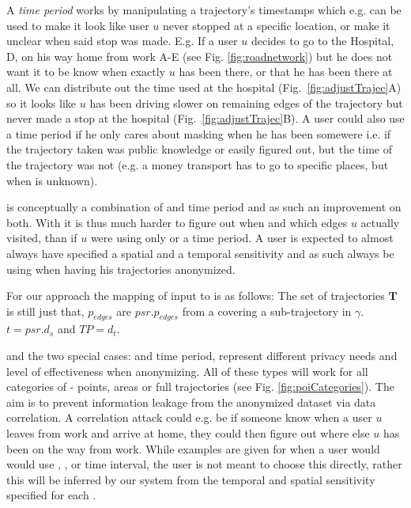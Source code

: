 A {\it time period} works by manipulating a trajectory's timestamps which e.g. can be used to make it look like user $u$ never stopped at a specific location, or make it unclear when said stop was made. E.g. If a user $u$ decides to go to the Hospital, D, on his way home from work A-E (see Fig. \ref{fig:roadnetwork}) but he does not want it to be know when exactly $u$ has been there, or that he has been there at all. We can distribute out the time used at the hospital (Fig.~\ref{fig:adjustTrajec}A) so it looks like $u$ has been driving slower on remaining edges of the trajectory but never made a stop at the hospital (Fig.~\ref{fig:adjustTrajec}B).
A user could also use a time period if he only cares about masking when he has been somewere i.e. if the trajectory taken was public knowledge or easily figured out, but the time of the trajectory was not (e.g. a money transport has to go to specific places, but when is unknown).

\tanon is conceptually a combination of \kanon and time period and as such an improvement on both. With \tanon it is thus much harder to figure out when and which edges $u$ actually visited, than if $u$ were using only \kanon or a time period. 
A user is expected to almost always have specified a spatial and a temporal sensitivity and as such always be using \tanon when having his trajectories anonymized.

For our approach the mapping of input to \tanon is as follows: The set of trajectories $\mathbf{T}$ is still just that, $p_{edges}$ are $psr.p_{edges}$ from a \poi covering a sub-trajectory in $\gamma$. $t = psr.d_s$ and $TP = d_t$.

\tanon and the two special cases: \kanon and time period, represent different privacy needs and level of effectiveness when anonymizing. All of these types will work for all categories of \pois -  points, areas or full trajectories (see Fig. \ref{fig:poiCategories}). The aim is to prevent information leakage from the anonymized dataset via data correlation. A correlation attack could e.g. be if someone know when a user $u$ leaves from work and arrive at home, they could then figure out where else $u$ has been on the way from work. While examples are given for when a user would would use \tanonns, \kanonns, or time interval, the user is not meant to choose this directly, rather this will be inferred by our system from the temporal and spatial sensitivity specified for each \poins.




